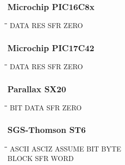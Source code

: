 \subsubsection{Microchip PIC16C8x}
{\tt\begin{tabbing}
\hspace{3cm}\=\hspace{3cm}\=\hspace{3cm}\=\hspace{3cm}\=\kill
DATA       \> RES         \> SFR         \> ZERO \\
\end{tabbing}}

\subsubsection{Microchip PIC17C42}
{\tt\begin{tabbing}
\hspace{3cm}\=\hspace{3cm}\=\hspace{3cm}\=\hspace{3cm}\=\kill
DATA       \> RES         \> SFR         \> ZERO \\
\end{tabbing}}

\subsubsection{Parallax SX20}
{\tt\begin{tabbing}
\hspace{3cm}\=\hspace{3cm}\=\hspace{3cm}\=\hspace{3cm}\=\kill
BIT        \> DATA        \> SFR         \> ZERO \\
\end{tabbing}}

\subsubsection{SGS-Thomson ST6}
{\tt\begin{tabbing}
\hspace{3cm}\=\hspace{3cm}\=\hspace{3cm}\=\hspace{3cm}\=\kill
ASCII      \> ASCIZ       \> ASSUME      \> BIT  \>  BYTE \\
BLOCK      \> SFR         \> WORD \\
\end{tabbing}}

